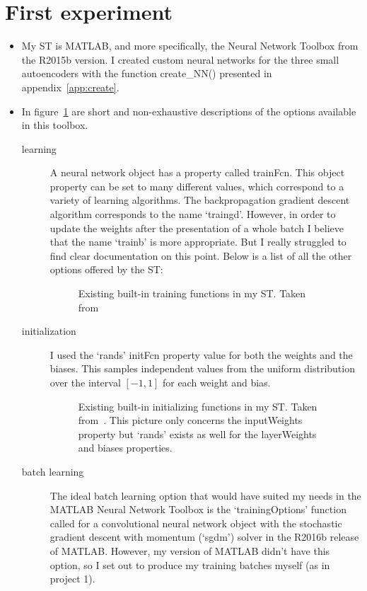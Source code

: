 \documentclass{article}
\begin{document}
\section{First experiment}
\begin{itemize}
\item My ST is MATLAB, and more specifically, the Neural Network Toolbox from the R2015b version. I created custom neural networks for the three small autoencoders with the function create\_NN() presented in appendix~\ref{app:create}.
\item In figure~\ref{fig:trainFcn} are short and non-exhaustive descriptions of the options available in this toolbox.
\begin{description}
\item[learning] A neural network object has a property called trainFcn. This object property can be set to many 
different values, which correspond to a variety of learning algorithms. The backpropagation gradient descent
algorithm corresponds to the name `traingd'. However, in order to update the weights after the presentation of a whole batch I believe that the name `trainb' is more appropriate. But I really struggled to find clear documentation on this
point. Below is a list of all the other options offered by the ST:
\begin{figure}
\centering
{}
\caption{Existing built-in training functions in my ST. Taken from~\cite{Demuth2006}}\label{fig:trainFcn}
\end{figure}
\item[initialization] I used the `rands' initFcn property value for both the weights and the biases. This samples 
independent values from the uniform distribution over the interval $[-1,1]$ for each weight and bias.
\begin{figure}
\centering
{}
\caption{Existing built-in initializing functions in my ST. Taken from~\cite{Demuth2006}. This picture only concerns the inputWeights property but `rands' exists as well for the layerWeights and biases properties.}
\end{figure}
\item[batch learning] The ideal batch learning option that would have suited my needs in the MATLAB Neural Network Toolbox is the `trainingOptions' function called for a convolutional neural network object with the stochastic gradient descent with momentum (`sgdm') solver in the R2016b release of MATLAB. However, my version of MATLAB didn't have this option,
so I set out to produce my training batches myself (as in project 1).


\end{description}
\end{itemize}
\end{document}
